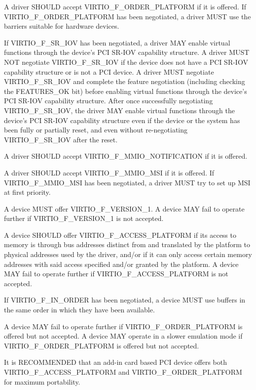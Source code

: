 A driver SHOULD accept VIRTIO_F_ORDER_PLATFORM if it is offered.
If VIRTIO_F_ORDER_PLATFORM has been negotiated, a driver MUST use
the barriers suitable for hardware devices.

If VIRTIO_F_SR_IOV has been negotiated, a driver MAY enable
virtual functions through the device's PCI SR-IOV capability
structure.  A driver MUST NOT negotiate VIRTIO_F_SR_IOV if
the device does not have a PCI SR-IOV capability structure
or is not a PCI device.  A driver MUST negotiate
VIRTIO_F_SR_IOV and complete the feature negotiation
(including checking the FEATURES_OK 
bit) before enabling virtual functions through the device's
PCI SR-IOV capability structure.  After once successfully
negotiating VIRTIO_F_SR_IOV, the driver MAY enable virtual
functions through the device's PCI SR-IOV capability
structure even if the device or the system has been fully
or partially reset, and even without re-negotiating
VIRTIO_F_SR_IOV after the reset.

A driver SHOULD accept VIRTIO_F_MMIO_NOTIFICATION if it is offered.

A driver SHOULD accept VIRTIO_F_MMIO_MSI if it is offered.
If VIRTIO_F_MMIO_MSI has been negotiated, a driver MUST try to
set up MSI at first priority.


A device MUST offer VIRTIO_F_VERSION_1.  A device MAY fail to operate further
if VIRTIO_F_VERSION_1 is not accepted.

A device SHOULD offer VIRTIO_F_ACCESS_PLATFORM if its access to
memory is through bus addresses distinct from and translated
by the platform to physical addresses used by the driver, and/or
if it can only access certain memory addresses with said access
specified and/or granted by the platform.
A device MAY fail to operate further if VIRTIO_F_ACCESS_PLATFORM is not
accepted.

If VIRTIO_F_IN_ORDER has been negotiated, a device MUST use
buffers in the same order in which they have been available.

A device MAY fail to operate further if
VIRTIO_F_ORDER_PLATFORM is offered but not accepted.
A device MAY operate in a slower emulation mode if
VIRTIO_F_ORDER_PLATFORM is offered but not accepted.

It is RECOMMENDED that an add-in card based PCI device
offers both VIRTIO_F_ACCESS_PLATFORM and
VIRTIO_F_ORDER_PLATFORM for maximum portability.

